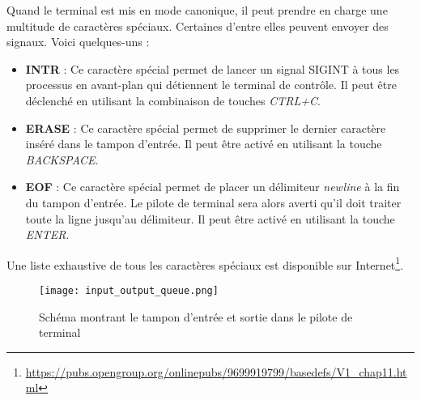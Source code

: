 Quand le terminal est mis en mode canonique, il peut prendre en charge une multitude de caractères spéciaux. Certaines d'entre elles peuvent envoyer des signaux. Voici quelques-uns :

\begin{itemize}
	\item \textbf{INTR} : Ce caractère spécial permet de lancer un signal SIGINT à tous les processus en avant-plan qui détiennent le terminal de contrôle. Il peut être déclenché en utilisant la combinaison de touches \textit{CTRL+C}.
	\item \textbf{ERASE} : Ce caractère spécial permet de supprimer le dernier caractère inséré dans le tampon d'entrée. Il peut être activé en utilisant la touche \textit{BACKSPACE}.
	\item \textbf{EOF} : Ce caractère spécial permet de placer un délimiteur \textit{newline} à la fin du tampon d'entrée. Le pilote de terminal sera alors averti qu'il doit traiter toute la ligne jusqu'au délimiteur. Il peut être activé en utilisant la touche \textit{ENTER}.
\end{itemize}

Une liste exhaustive de tous les caractères spéciaux est disponible sur Internet\footnote{\url{https://pubs.opengroup.org/onlinepubs/9699919799/basedefs/V1_chap11.html}}.

\begin{figure}[h]
	\centering
	\texttt{[image: input\_output\_queue.png]}
	\caption{Schéma montrant le tampon d'entrée et sortie dans le pilote de terminal}
\end{figure}

